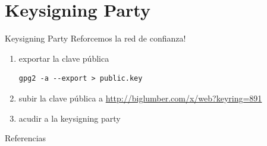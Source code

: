 \documentclass{beamer}
\begin{document}
\section{Keysigning Party}
\begin{frame}[fragile]{Keysigning Party}
Reforcemos la red de confianza!
\begin{enumerate}
    \item exportar la clave pública
        \begin{lstlisting}
gpg2 -a --export > public.key
        \end{lstlisting}
    \item subir la clave pública a \url{http://biglumber.com/x/web?keyring=891}
    \item acudir a la keysigning party
\end{enumerate}
\end{frame}


\begin{frame}[allowframebreaks]{Referencias}
    \nocite{*}
    \printbibliography
\end{frame}
\end{document}
